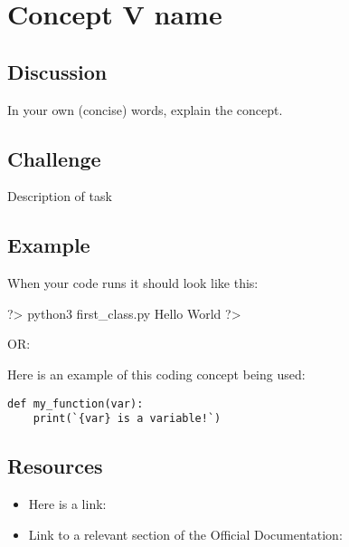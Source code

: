 \documentclass{42-en}
\begin{document}
\nextexercice
\chapter{Concept V name}

\section{Discussion}

In your own (concise) words, explain the concept.

\section{Challenge}


\makeheaderfiles
Description of task\\

\section{Example}
When your code runs it should look like this: 

\begin{42console}
	?> python3 first_class.py
	Hello World
	?>
\end{42console}

OR:

Here is an example of this coding concept being used:
\begin{verbatim}
def my_function(var):
    print(`{var} is a variable!`)
\end{verbatim}

\section{Resources}
\begin{itemize}
	\item Here is a link:
    \item Link to a relevant section of the Official Documentation:
\end{itemize}
\end{document}
